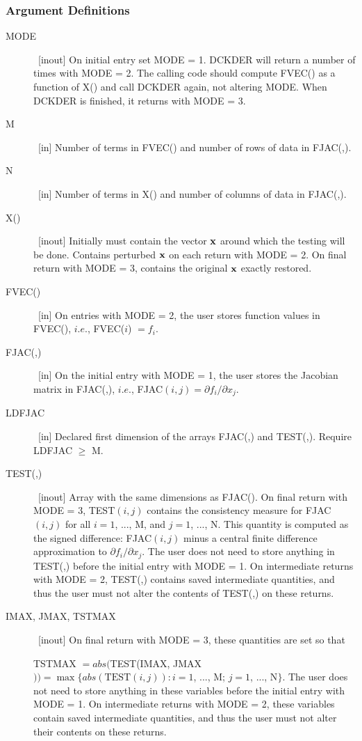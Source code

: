 \documentclass[twoside]{MATH77}
\begin{document}
\subsubsection{Argument Definitions}

\begin{description}
\item[MODE]  \ [inout] On initial entry set MODE = 1. DCKDER will return a
number of times with MODE = 2. The calling code should compute FVEC() as a
function of X() and call DCKDER again, not altering MODE. When DCKDER is
finished, it returns with MODE = 3.

\item[M]  \ [in] Number of terms in FVEC() and number of rows of data in
FJAC(,).

\item[N]  \ [in] Number of terms in X() and number of columns of data in
FJAC(,).

\item[X()]  \ [inout] Initially must contain the vector ${\bf x}$ around
which the testing will be done. Contains perturbed ${\bf x}$ on each return
with MODE = 2. On final return with MODE = 3, contains the original ${\bf x}$
exactly restored.

\item[FVEC()]  \ [in] On entries with MODE = 2, the user stores function
values in FVEC(), $i.e.$, FVEC($i$) $=f_i.$

\item[FJAC(,)]  \ [in] On the initial entry with MODE = 1, the user stores
the Jacobian matrix in FJAC(,), $i.e.$, FJAC$(i,j)=\partial f_i/\partial
x_j.$

\item[LDFJAC]  \ [in] Declared first dimension of the arrays FJAC(,) and
TEST(,). Require LDFJAC $\geq $ M.

\item[TEST(,)]  \ [inout] Array with the same dimensions as FJAC(). On final
return with MODE = 3, TEST$(i,j)$ contains the consistency measure for FJAC$%
(i,j)$ for all $i=1$, ..., M, and $j=1$, ..., N. This quantity is computed
as the signed difference: FJAC$(i,j)$ minus a central finite difference
approximation to $\partial f_i/\partial x_j$. The user does not need to
store anything in TEST(,) before the initial entry with MODE = 1. On
intermediate returns with MODE = 2, TEST(,) contains saved intermediate
quantities, and thus the user must not alter the contents of TEST(,) on
these returns.

\item[IMAX, JMAX, TSTMAX]  \ [inout] On final return with MODE = 3, these
quantities are set so that

TSTMAX $=abs($TEST(IMAX, JMAX$))=\max \{abs(\text{TEST}(i,j)):i=1$, ..., M; $%
j=1$, ..., N$\}$. The user does not need to store anything in these
variables before the initial entry with MODE = 1. On intermediate returns
with MODE = 2, these variables contain saved intermediate quantities, and
thus the user must not alter their contents on these returns.
\end{description}
\end{document}
